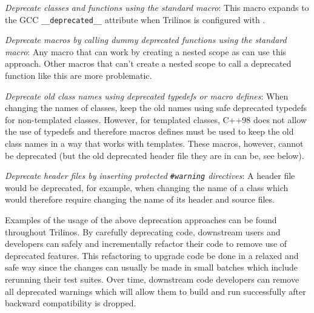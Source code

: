 \documentclass[11pt]{SANDreport}
\begin{document}
\begin{compactitem}

{}\item\textit{Deprecate classes and functions using the standard
{} macro}: This macro expands to the
GCC {}\texttt{\_\_deprecated\_\_} attribute when Trilinos is
configured with {}.

{}\item\textit{Deprecate macros by calling dummy deprecated functions
using the standard {} macro}: Any
macro that can work by creating a nested scope as {} can use this approach.  Other macros
that can't create a nested scope to call a deprecated function like
this are more problematic.

{}\item\textit{Deprecate old class names using deprecated typedefs or
macro defines}: When changing the names of classes, keep the old names
using safe deprecated typedefs for non-templated classes.  However,
for templated classes, C++98 does not allow the use of typedefs and
therefore macros defines must be used to keep the old class names in a
way that works with templates.  These macros, however, cannot be
deprecated (but the old deprecated header file they are in can be, see
below).

{}\item\textit{Deprecate header files by inserting protected
{}\texttt{\#warning} directives}: A header file would be deprecated,
for example, when changing the name of a class which would therefore
require changing the name of its header and source files.

\end{compactitem}

Examples of the usage of the above deprecation approaches can be found
throughout Trilinos.  By carefully deprecating code, downstream users
and developers can safely and incrementally refactor their code to
remove use of deprecated features.  This refactoring to upgrade code
be done in a relaxed and safe way since the changes can usually be
made in small batches which include rerunning their test suites.  Over
time, downstream code developers can remove all deprecated warnings
which will allow them to build and run successfully after backward
compatibility is dropped.
\end{document}
